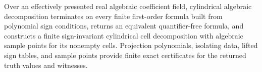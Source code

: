 Over an effectively presented real algebraic coefficient field, cylindrical algebraic decomposition terminates on every finite first-order formula built from polynomial sign conditions, returns an equivalent quantifier-free formula, and constructs a finite sign-invariant cylindrical cell decomposition with algebraic sample points for its nonempty cells.  Projection polynomials, isolating data, lifted sign tables, and sample points provide finite exact certificates for the returned truth values and witnesses.